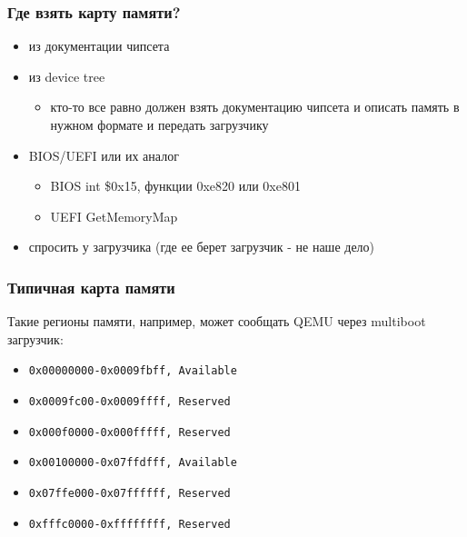 \begin{frame}
\frametitle{Где взять карту памяти?}

\begin{itemize}
  \item<1-> из документации чипсета
  \item<2-> из device tree
    \begin{itemize}
      \item кто-то все равно должен взять документацию чипсета и описать память в нужном формате и передать загрузчику
    \end{itemize}
  \item<3-> BIOS/UEFI или их аналог
    \begin{itemize}
      \item BIOS int \$0x15, функции 0xe820 или 0xe801
      \item UEFI GetMemoryMap
    \end{itemize}
  \item<4-> спросить у загрузчика (где ее берет загрузчик - не наше дело)
\end{itemize}
\end{frame}

\begin{frame}
\frametitle{Типичная карта памяти}

Такие регионы памяти, например, может сообщать QEMU через multiboot загрузчик:

\begin{itemize}
  \item \texttt{0x00000000-0x0009fbff, Available}
  \item \texttt{0x0009fc00-0x0009ffff, Reserved}
  \item \texttt{0x000f0000-0x000fffff, Reserved}
  \item \texttt{0x00100000-0x07ffdfff, Available}
  \item \texttt{0x07ffe000-0x07ffffff, Reserved}
  \item \texttt{0xfffc0000-0xffffffff, Reserved}
\end{itemize}

\end{frame}

